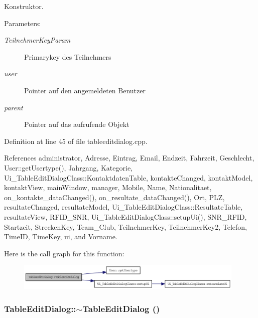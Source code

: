 Konstruktor. 

\begin{Desc}
\item[Parameters:]
\begin{description}
\item[{\em TeilnehmerKeyParam}]Primarykey des Teilnehmers \item[{\em user}]Pointer auf den angemeldeten Benutzer \item[{\em parent}]Pointer auf das aufrufende Objekt \end{description}
\end{Desc}


Definition at line 45 of file tableeditdialog.cpp.

References administrator, Adresse, Eintrag, Email, Endzeit, Fahrzeit, Geschlecht, User::getUsertype(), Jahrgang, Kategorie, Ui\_\-TableEditDialogClass::KontaktdatenTable, kontakteChanged, kontaktModel, kontaktView, mainWindow, manager, Mobile, Name, Nationalitaet, on\_\-kontakte\_\-dataChanged(), on\_\-resultate\_\-dataChanged(), Ort, PLZ, resultateChanged, resultateModel, Ui\_\-TableEditDialogClass::ResultateTable, resultateView, RFID\_\-SNR, Ui\_\-TableEditDialogClass::setupUi(), SNR\_\-RFID, Startzeit, StreckenKey, Team\_\-Club, TeilnehmerKey, TeilnehmerKey2, Telefon, TimeID, TimeKey, ui, and Vorname.

Here is the call graph for this function:\nopagebreak
\begin{figure}[H]
\begin{center}
\leavevmode
\includegraphics[width=310pt]{class_table_edit_dialog_f1bf42b072c27aeb0eb3f29d497a0a8f_cgraph}
\end{center}
\end{figure}
\hypertarget{class_table_edit_dialog_cb768ab9eaca499eee124debc9762067}{
\subsubsection[$\sim$TableEditDialog]{\setlength{\rightskip}{0pt plus 5cm}TableEditDialog::$\sim$TableEditDialog ()}}
\label{class_table_edit_dialog_cb768ab9eaca499eee124debc9762067}


